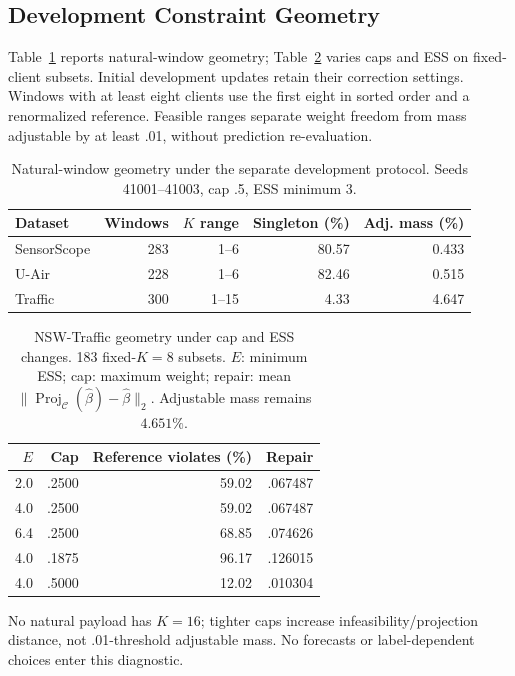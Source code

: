 \subsection{Development Constraint Geometry}

Table~\ref{tab:development_geometry} reports natural-window geometry;
Table~\ref{tab:geometry_sensitivity} varies caps and ESS on fixed-client subsets.
Initial development updates retain their correction settings. Windows
with at least eight clients use the first eight in sorted order and a
renormalized reference. Feasible ranges separate weight freedom from mass
adjustable by at least .01, without prediction re-evaluation.

\begin{table}[!htbp]
\centering
\caption{Natural-window geometry under the separate development protocol.
Seeds 41001--41003, cap .5, ESS minimum 3.}
\label{tab:development_geometry}
\footnotesize
\setlength{\tabcolsep}{3pt}
\begin{tabular}{lrrrr}
\toprule
Dataset & Windows & $K$ range & Singleton (\%) & Adj. mass (\%)\\
\midrule
SensorScope & 283 & 1--6 & 80.57 & 0.433\\
U-Air & 228 & 1--6 & 82.46 & 0.515\\
Traffic & 300 & 1--15 & 4.33 & 4.647\\
\bottomrule
\end{tabular}
\end{table}

\begin{table}[!htbp]
\centering
\caption{NSW-Traffic geometry under cap and ESS changes.
183 fixed-$K=8$ subsets. $E$: minimum ESS; cap: maximum weight;
repair: mean $\|\operatorname{Proj}_{\mathcal C}(\widehat\beta)-\widehat\beta\|_2$.
Adjustable mass remains $4.651\%$.}
\label{tab:geometry_sensitivity}
\footnotesize
\setlength{\tabcolsep}{4pt}
\begin{tabular*}{\columnwidth}{@{\extracolsep{\fill}}rrrr}
\toprule
$E$ & Cap & Reference violates (\%) & Repair\\
\midrule
2.0 & .2500 & 59.02 & .067487\\
4.0 & .2500 & 59.02 & .067487\\
6.4 & .2500 & 68.85 & .074626\\
4.0 & .1875 & 96.17 & .126015\\
4.0 & .5000 & 12.02 & .010304\\
\bottomrule
\end{tabular*}
\end{table}

No natural payload has $K=16$; tighter caps increase infeasibility/projection
distance, not .01-threshold adjustable mass. No forecasts or label-dependent
choices enter this diagnostic.

